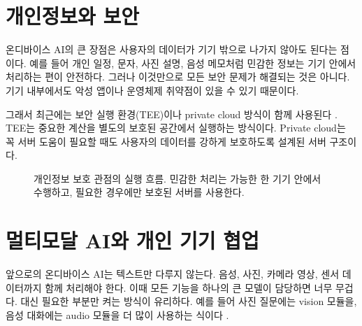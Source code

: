 \documentclass[twocolumn,10pt]{article}
\begin{document}
\section{개인정보와 보안}
온디바이스 AI의 큰 장점은 사용자의 데이터가 기기 밖으로 나가지 않아도 된다는 점이다. 예를 들어 개인 일정, 문자, 사진 설명, 음성 메모처럼 민감한 정보는 기기 안에서 처리하는 편이 안전하다. 그러나 이것만으로 모든 보안 문제가 해결되는 것은 아니다. 기기 내부에서도 악성 앱이나 운영체제 취약점이 있을 수 있기 때문이다.

그래서 최근에는 보안 실행 환경(TEE)이나 private cloud 방식이 함께 사용된다 \cite{arm_cca_2024,apple_pcc_2024}. TEE는 중요한 계산을 별도의 보호된 공간에서 실행하는 방식이다. Private cloud는 꼭 서버 도움이 필요할 때도 사용자의 데이터를 강하게 보호하도록 설계된 서버 구조이다.

\begin{figure}[t]
\centering
{}
\caption{개인정보 보호 관점의 실행 흐름. 민감한 처리는 가능한 한 기기 안에서 수행하고, 필요한 경우에만 보호된 서버를 사용한다.}
\label{fig:ko_privacy}
\end{figure}

\section{멀티모달 AI와 개인 기기 협업}
앞으로의 온디바이스 AI는 텍스트만 다루지 않는다. 음성, 사진, 카메라 영상, 센서 데이터까지 함께 처리해야 한다. 이때 모든 기능을 하나의 큰 모델이 담당하면 너무 무겁다. 대신 필요한 부분만 켜는 방식이 유리하다. 예를 들어 사진 질문에는 vision 모듈을, 음성 대화에는 audio 모듈을 더 많이 사용하는 식이다 \cite{minicpm_v_2025,moshi2024}.
\end{document}
